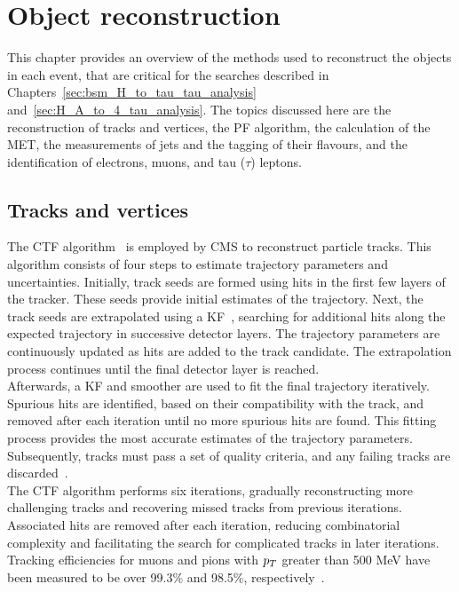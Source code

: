 \chapter{Object reconstruction}
\label{sec:object_reconstruction}

This chapter provides an overview of the methods used to reconstruct the objects in each event, that are critical for the searches described in Chapters~\ref{sec:bsm_H_to_tau_tau_analysis} and~\ref{sec:H_A_to_4_tau_analysis}.
The topics discussed here are the reconstruction of tracks and vertices, the \ac{PF} algorithm, the calculation of the \ac{MET}, the measurements of jets and the tagging of their flavours, and the identification of electrons, muons, and tau ($\tau$) leptons.

\section{Tracks and vertices}
\label{sec:track_and_vertex}

The \ac{CTF} algorithm~\cite{CMS:2014pgm} is employed by \ac{CMS} to reconstruct particle tracks. 
This algorithm consists of four steps to estimate trajectory parameters and uncertainties. 
Initially, track seeds are formed using hits in the first few layers of the tracker. 
These seeds provide initial estimates of the trajectory. 
Next, the track seeds are extrapolated using a \ac{KF}~\cite{Fruhwirth:1987fm}, searching for additional hits along the expected trajectory in successive detector layers. 
The trajectory parameters are continuously updated as hits are added to the track candidate. 
The extrapolation process continues until the final detector layer is reached. \\

Afterwards, a \ac{KF} and smoother are used to fit the final trajectory iteratively. 
Spurious hits are identified, based on their compatibility with the track, and removed after each iteration until no more spurious hits are found. 
This fitting process provides the most accurate estimates of the trajectory parameters. 
Subsequently, tracks must pass a set of quality criteria, and any failing tracks are discarded~\cite{Fruhwirth:1987fm}. \\

The \ac{CTF} algorithm performs six iterations, gradually reconstructing more challenging tracks and recovering missed tracks from previous iterations. 
Associated hits are removed after each iteration, reducing combinatorial complexity and facilitating the search for complicated tracks in later iterations. 
Tracking efficiencies for muons and pions with $p_{T}$ greater than 500 MeV have been measured to be over 99.3\% and 98.5\%, respectively~\cite{CMS:2010mua}. \\

